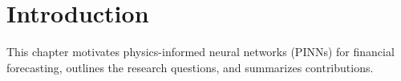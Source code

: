 \chapter{Introduction}

This chapter motivates physics-informed neural networks (PINNs) for financial forecasting, outlines the research questions, and summarizes contributions.
